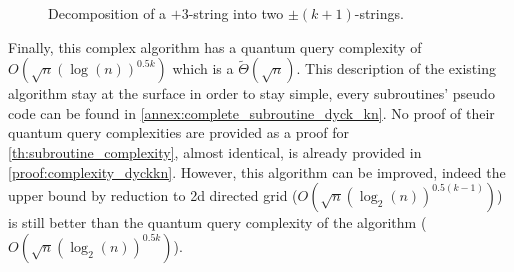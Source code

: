\begin{itemize}
          \begin{figure}[h!]
              \centering
              \caption{Decomposition of a $+3$-string into two $\pm(k+1)$-strings.}
              \label{fig:dyck_hered}
          \end{figure}
\end{itemize}

Finally, this complex algorithm has a quantum query
complexity of $O\left(\sqrt{n}(\log(n))^{0.5k}\right)$ which is a
$\tilde{\Theta}\left(\sqrt{n}\right)$. This description of the existing
algorithm stay at the surface in order to stay simple, every
subroutines' pseudo code can be found in
\autoref{annex:complete_subroutine_dyck_kn}. No proof of their
quantum query complexities are provided as a proof for
\autoref{th:subroutine_complexity}, almost identical,
is already provided in \autoref{proof:complexity_dyckkn}.
However, this algorithm can be improved, indeed the upper bound by
reduction to 2d directed grid ($O\left(\sqrt{n}(\log_2(n))^{0.5(k-1)}\right)$)
is still better than the quantum query complexity of the algorithm
($O\left(\sqrt{n}(\log_2(n))^{0.5k}\right)$).
